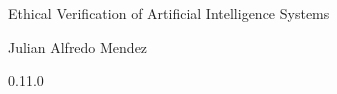 \documentclass[12pt,a4paper]{book}
\begin{document}
    \begin{center}

        \phantom{H}

        \vspace{80mm}

        {\huge{Ethical Verification of Artificial Intelligence Systems}}

        \vspace{80mm}
        Julian Alfredo Mendez

        \vspace{10mm}
        0.11.0

    \end{center}

    \newpage

    
    
    
    

    
    

    
    
    
    
    

    
    
\end{document}
